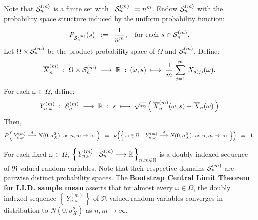 \begin{theorem}
Note that $\mathcal{S}^{(m)}_{n}$ is a finite set with $\vert\;\mathcal{S}^{(m)}_{n}\;\vert = n^{m}$.
Endow $\mathcal{S}^{(m)}_{n}$ with the probability space structure induced by the uniform probability function:
\begin{equation*}
P_{\mathcal{S}^{(m)}_{n}}(s) \;\; := \;\; \dfrac{1}{n^{m}},
\quad\textnormal{for each $s \in \mathcal{S}^{(m)}_{n}$}.
\end{equation*}
Let $\Omega \times \mathcal{S}^{(m)}_{n}$ be the product probability space of $\Omega$ and $\mathcal{S}^{(m)}_{n}$.
Define:
\begin{equation*}
\overline{X}^{(m)}_{n}
\;:\;\Omega \times \mathcal{S}^{(m)}_{n} \;\longrightarrow \; \mathbb{R}
\;:\; (\omega,s) \; \longmapsto \; \dfrac{1}{m}\,\sum^{m}_{j=1}\,X_{s(j)}(\omega).
\end{equation*}
For each $\omega \in \Omega$, define:
\begin{equation*}
Y^{(m)}_{n,\omega}
\;:\;
\mathcal{S}^{(m)}_{n}\;\longrightarrow\; \mathbb{R}
\;:\;
s
\;\longmapsto\;
\sqrt{m}\left(\,\overline{X}^{(m)}_{n}(\omega,s) - \overline{X}_{n}(\omega)\,\right)
\end{equation*}
Then,
\begin{equation*}
P\!\left(\;
Y^{(m)}_{n,\omega} \overset{d}{\longrightarrow} N(0,\sigma^{2}_{X}),\,\textnormal{as $n,m\rightarrow\infty$}
\;\right)
\;\; = \;\;
\nu\!\left(\left\{\;
\omega \in \Omega
\;\left\vert\;
Y^{(m)}_{n,\omega} \overset{d}{\longrightarrow} N(0,\sigma^{2}_{X}),\,\textnormal{as $n,m\rightarrow\infty$}
\right.
\;\right\}\right)
\;\; = \;\;
1.
\end{equation*}
\end{theorem}

\begin{remark}
\mbox{}\vskip 0.1cm
\noindent
For each fixed $\omega \in \Omega$,
$\left\{\,Y^{(m)}_{n,\omega} : \mathcal{S}^{(m)}_{n} \longrightarrow \mathbb{R}\,\right\}_{n,m\in\mathbb{N}}$
is a doubly indexed sequence of $\Re$-valued random variables.
Note that their respective domains $\mathcal{S}^{(m)}_{n}$ are pairwise distinct probability spaces.
The \textbf{Bootstrap Central Limit Theorem for I.I.D. sample mean}
asserts that for almost every $\omega \in \Omega$,
the doubly indexed sequence $\left\{\,Y^{(m)}_{n,\omega}\,\right\}$
of $\Re$-valued random variables converges in distribution to
$N(0,\sigma^{2}_{X})$ as $n, m \longrightarrow \infty$.
\end{remark}

